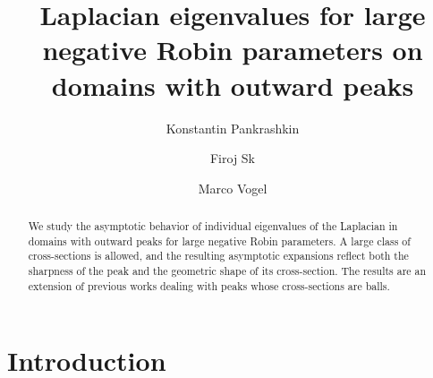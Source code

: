 \documentclass[11pt,oneside,reqno,a4paper]{amsart}
\title[]{Laplacian eigenvalues for large negative Robin parameters on domains with outward peaks}
\author[]{Konstantin Pankrashkin}
\author[]{Firoj Sk}
\author[]{Marco Vogel}
\theoremstyle{definition}
\begin{document}
\begin{abstract}
	We study the asymptotic behavior of individual eigenvalues of the Laplacian in domains with outward peaks for large negative Robin parameters. A large class of cross-sections is allowed, and the resulting asymptotic expansions reflect both the sharpness of the peak and the geometric shape of its cross-section. The results are an extension of previous works dealing with peaks whose cross-sections are balls.
\end{abstract}

	
	\maketitle
	
	
	\renewcommand{\proofname}{\bf Proof}
	
	
\section{Introduction}
\end{document}
